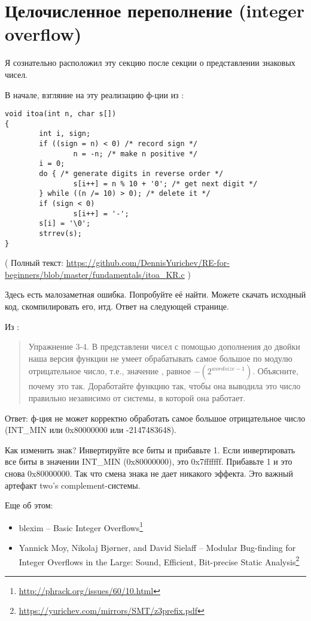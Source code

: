 \section{Целочисленное переполнение (integer overflow)}

Я сознательно расположил эту секцию после секции о представлении знаковых чисел.

В начале, взгляние на эту реализацию ф-ции  из \InSqBrackets{\KRBook}:

\begin{lstlisting}[style=customc]
void itoa(int n, char s[])
{
        int i, sign;
        if ((sign = n) < 0) /* record sign */
                n = -n; /* make n positive */
        i = 0;
        do { /* generate digits in reverse order */
                s[i++] = n % 10 + '0'; /* get next digit */
        } while ((n /= 10) > 0); /* delete it */
        if (sign < 0)
                s[i++] = '-';
        s[i] = '\0';
        strrev(s);
}
\end{lstlisting}

( Полный текст: \url{https://github.com/DennisYurichev/RE-for-beginners/blob/master/fundamentals/itoa_KR.c} )

Здесь есть малозаметная ошибка. Попробуйте её найти. Можете скачать исходный код, скомпилировать его, итд.
Ответ на следующей странице.

\clearpage

Из \InSqBrackets{\KRBook}:

\begin{framed}
\begin{quotation}
Упражнение 3-4. В представлени чисел с помощью дополнения до двойки наша версия функции 
не умеет обрабатывать самое большое по модулю отрицательное число, т.е., значение 
, равное $-(2^{wordsize-1})$. Объясните, почему это так. Доработайте функцию так, чтобы она
выводила это число правильно независимо от системы, в которой она работает.
\end{quotation}
\end{framed}

Ответ: ф-ция не может корректно обработать самое большое отрицательное число (INT\_MIN или 0x80000000 или -2147483648).

Как изменить знак? Инвертируйте все биты и прибавьте 1.
Если инвертировать все биты в значении INT\_MIN (0x80000000), это 0x7fffffff. Прибавьте 1 и это снова 0x80000000.
Так что смена знака не дает никакого эффекта.
Это важный артефакт two's complement-системы.

Еще об этом:

\begin{itemize}
\item blexim -- Basic Integer Overflows\footnote{\url{http://phrack.org/issues/60/10.html}}

\item Yannick Moy, Nikolaj Bjørner, and David Sielaff -- Modular Bug-finding for Integer Overflows in the Large: Sound, Efficient, Bit-precise Static Analysis\footnote{\url{https://yurichev.com/mirrors/SMT/z3prefix.pdf}}
\end{itemize}

